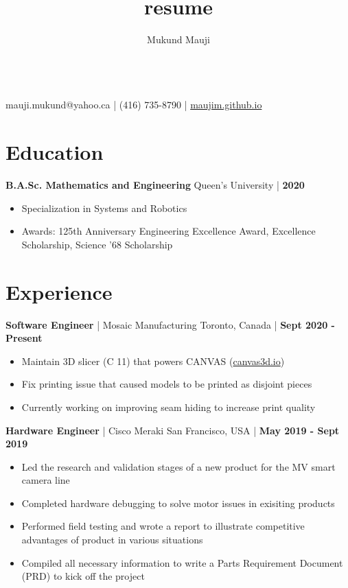 \documentclass[11pt]{article}
\makeatletter
\renewcommand{\maketitle}%
{
\begin{center}
{\Huge\bfseries\theauthor}
\vspace{0.25em}\\
{\large
    mauji.mukund@yahoo.ca | (416) 735-8790 | 
    \href{https://maujim.github.io}{maujim.github.io}
}
\end{center}
}%
\newcommand{\jobentry}[4]%
{
\vspace{-0.1em} \noindent
{\large {\bfseries #1} | #2}
\hfill
#3 {\large | {\bfseries #4}}
\vspace{-0.25em}
}%
\makeatother
\begin{document}
\title{resume}
\author{Mukund Mauji}
\maketitle

\section{Education}%
\vspace{-0.1em} \noindent
{\large\bfseries B.A.Sc. Mathematics and Engineering} 
\hfill Queen's University 
{\large | {\bfseries  2020}}
\vspace{-0.25em}
\begin{itemize}%
    \item Specialization in Systems and Robotics
    \item Awards: 125th Anniversary Engineering Excellence Award, Excellence Scholarship, Science ’68 Scholarship
\end{itemize}%

\section{Experience}%
\jobentry{Software Engineer}{Mosaic Manufacturing}{Toronto, Canada}{Sept 2020 - Present}
\begin{itemize}%
    \item Maintain 3D slicer (C{\nolinebreak[4]\hspace{-.05em}\raisebox{.4ex}{\tiny\bf ++}} 11) that powers CANVAS (\href{https://canvas3d.io/}{canvas3d.io})
    \item Fix printing issue that caused models to be printed as disjoint pieces
    \item Currently working on improving seam hiding to increase print quality
\end{itemize}%

\jobentry{Hardware Engineer}{Cisco Meraki}{San Francisco, USA}{May 2019 - Sept 2019}
\begin{itemize}%
    \item Led the research and validation stages of a new product for the MV smart camera line
    \item Completed hardware debugging to solve motor issues in exisiting products
    \item Performed field testing and wrote a report to illustrate competitive advantages of product in various situations
    \item Compiled all necessary information to write a Parts Requirement Document (PRD) to kick off the project
\end{itemize}%
\end{document}
